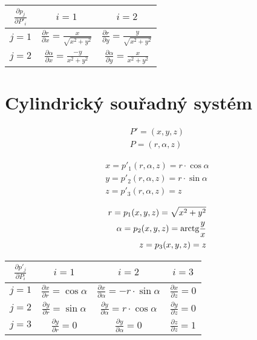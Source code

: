 \begin{tabular}{| c || c | c |}
\hline
\(\frac{\partial p_j}{\partial P'_i}\) & \(i=1\) & \(i=2\) \\
\hline
\hline
\(j=1\) & \(\frac{\partial r}{\partial x} = \frac{x}{\sqrt{x^2 + y^2}}\) & \(\frac{\partial r}{\partial y} = \frac{y}{\sqrt{x^2 + y^2}}\) \\
\hline
\(j=2\) & \(\frac{\partial \alpha}{\partial x} = \frac{-y}{x^2 + y^2}\) & \(\frac{\partial \alpha}{\partial y} = \frac{x}{x^2 + y^2}\) \\
\hline
\end{tabular}

\section{Cylindrický souřadný systém}

\begin{equation}
\begin{split}
P' = (x, y, z) \\
P = (r, \alpha, z)
\end{split}
\end{equation}

\begin{equation}
\begin{split}
x = p'_1(r, \alpha, z) = r \cdot \cos \alpha \\
y = p'_2(r, \alpha, z) = r \cdot \sin \alpha \\
z = p'_3(r, \alpha, z) = z
\end{split}
\end{equation}

\begin{equation}
\begin{split}
r = p_1(x, y, z) = \sqrt{x^2 + y^2} \\
\alpha = p_2(x, y, z) = \mathrm{arctg} \frac{y}{x} \\
z = p_3(x, y, z) = z
\end{split}
\end{equation}

\begin{tabular}{| c || c | c | c |}
\hline
\(\frac{\partial p'_j}{\partial P_i}\) & \(i=1\) & \(i=2\) & \(i=3\) \\
\hline
\hline
\(j=1\) & \(\frac{\partial x}{\partial r} = \cos \alpha\) & \(\frac{\partial x}{\partial \alpha} = -r \cdot \sin \alpha\) & \(\frac{\partial x}{\partial z} = 0\) \\
\hline
\(j=2\) & \(\frac{\partial y}{\partial r} = \sin \alpha\) & \(\frac{\partial y}{\partial \alpha} = r \cdot \cos \alpha\) & \(\frac{\partial y}{\partial z} = 0\) \\
\hline
\(j=3\) & \(\frac{\partial y}{\partial r} = 0\) & \(\frac{\partial y}{\partial \alpha} = 0\) & \(\frac{\partial z}{\partial z} = 1\) \\
\hline
\end{tabular}

